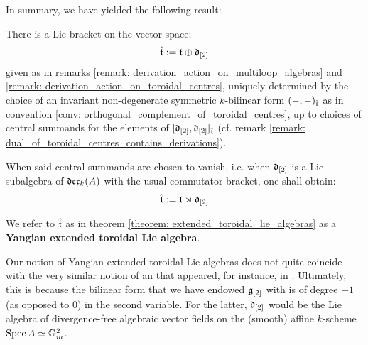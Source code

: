         In summary, we have yielded the following result:
        \begin{theorem} \label{theorem: extended_toroidal_lie_algebras}
            There is a Lie bracket on the vector space:
                $$\hat{\mathfrak{t}} := \mathfrak{t} \oplus \mathfrak{d}_{[2]}$$
            given as in remarks \ref{remark: derivation_action_on_multiloop_algebras} and \ref{remark: derivation_action_on_toroidal_centres}, uniquely determined by the choice of an invariant non-degenerate symmetric $k$-bilinear form $(-, -)_{\hat{\mathfrak{t}}}$ as in convention \ref{conv: orthogonal_complement_of_toroidal_centres}, up to choices of central summands for the elements of $[\mathfrak{d}_{[2]}, \mathfrak{d}_{[2]}]_{\hat{\mathfrak{t}}}$ (cf. remark \ref{remark: dual_of_toroidal_centres_contains_derivations}).

            When said central summands are chosen to vanish, i.e. when $\mathfrak{d}_{[2]}$ is a Lie subalgebra of $\mathfrak{der}_{k}(A)$ with the usual commutator bracket, one shall obtain:
                $$\hat{\mathfrak{t}} := \mathfrak{t} \rtimes \mathfrak{d}_{[2]}$$
        \end{theorem}
        \begin{definition} \label{def: extended_toroidal_lie_algebras}
            We refer to $\hat{\mathfrak{t}}$ as in theorem \ref{theorem: extended_toroidal_lie_algebras} as a \textbf{Yangian extended toroidal Lie algebra}. 
        \end{definition}
        \begin{remark}
            Our notion of Yangian extended toroidal Lie algebras does not quite coincide with the very similar notion of an  that appeared, for instance, in \cite{billig_representations_of_toroidal_extended_affine_lie_algebras}. Ultimately, this is because the bilinear form that we have endowed $\mathfrak{g}_{[2]}$ with is of degree $-1$ (as opposed to $0$) in the second variable. For the latter, $\mathfrak{d}_{[2]}$ would be the Lie algebra of divergence-free algebraic vector fields on the (smooth) affine $k$-scheme $\operatorname{Spec} A \simeq \mathbb{G}_m^2$.
        \end{remark}
        
